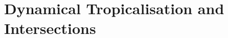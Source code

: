 \documentclass[11pt]{amsart}
\theoremstyle{definition}
\newcommand{\lto}{\longrightarrow}
\newcommand{\trop}{\mathrm{trop}}
\newcommand{\sT}{\mathscr{T}}
\newcommand{\sW}{\mathscr{W}}
\newcommand{\supp}[1]{{\mathrm{supp}(#1)}}
\begin{document}





\textcolor{red}{}

\section{Dynamical Tropicalisation and Intersections}
\end{document}
